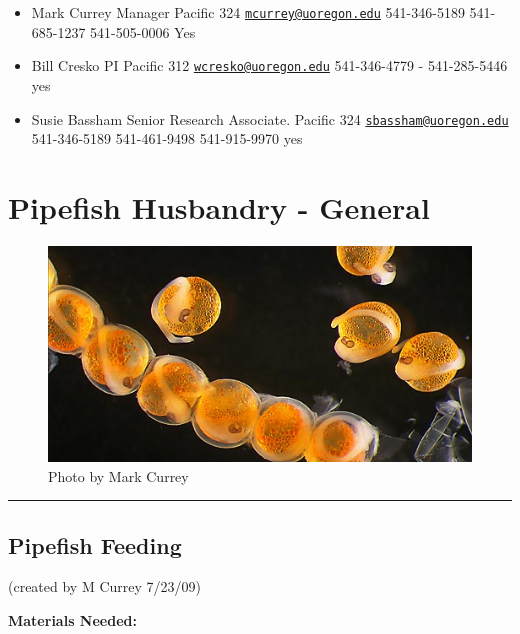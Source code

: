 \documentclass[
]{book}
\providecommand{\tightlist}{%
  \setlength{\itemsep}{0pt}\setlength{\parskip}{0pt}}
\begin{document}
\begin{itemize}
\tightlist
\item
  Mark Currey Manager Pacific 324 \href{mailto:mcurrey@uoregon.edu}{\nolinkurl{mcurrey@uoregon.edu}} 541-346-5189 541-685-1237 541-505-0006 Yes
\item
  Bill Cresko PI Pacific 312 \href{mailto:wcresko@uoregon.edu}{\nolinkurl{wcresko@uoregon.edu}} 541-346-4779 - 541-285-5446 yes
\item
  Susie Bassham Senior Research Associate. Pacific 324 \href{mailto:sbassham@uoregon.edu}{\nolinkurl{sbassham@uoregon.edu}} 541-346-5189 541-461-9498 541-915-9970 yes
\end{itemize}

\hypertarget{pipefish-husbandry---general}{%
\chapter{Pipefish Husbandry - General}\label{pipefish-husbandry---general}}

\begin{figure}
\centering
\includegraphics{images/pipefish_embryos.jpg}
\caption{Photo by Mark Currey}
\end{figure}

\begin{center}\rule{0.5\linewidth}{0.5pt}\end{center}

\hypertarget{pipefish-feeding}{%
\section{Pipefish Feeding}\label{pipefish-feeding}}

(created by M Currey 7/23/09)

\textbf{Materials Needed:}
\end{document}
